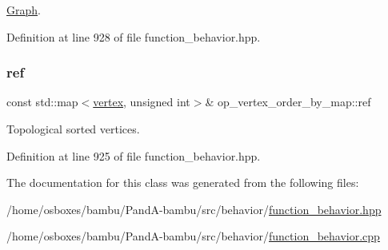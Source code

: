 \hyperlink{structGraph}{Graph}. 



Definition at line 928 of file function\+\_\+behavior.\+hpp.

\mbox{\label{classop__vertex__order__by__map_a843cf2fd586d00ce81ef4f65ded8f637}} 
\subsubsection{\texorpdfstring{ref}{ref}}
{\footnotesize\ttfamily const std\+::map$<$\hyperlink{graph_8hpp_abefdcf0544e601805af44eca032cca14}{vertex}, unsigned int$>$\& op\+\_\+vertex\+\_\+order\+\_\+by\+\_\+map\+::ref\hspace{0.3cm}{\ttfamily [private]}}



Topological sorted vertices. 



Definition at line 925 of file function\+\_\+behavior.\+hpp.



The documentation for this class was generated from the following files\+:\begin{DoxyCompactItemize}
\item 
/home/osboxes/bambu/\+Pand\+A-\/bambu/src/behavior/\hyperlink{function__behavior_8hpp}{function\+\_\+behavior.\+hpp}\item 
/home/osboxes/bambu/\+Pand\+A-\/bambu/src/behavior/\hyperlink{function__behavior_8cpp}{function\+\_\+behavior.\+cpp}\end{DoxyCompactItemize}
